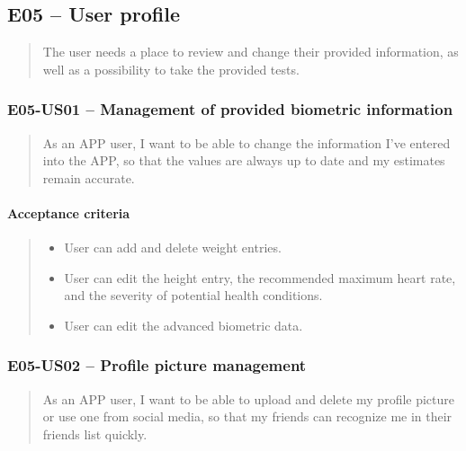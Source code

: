 
\subsection*{E05 -- User profile}
\begin{quote}
The user needs a place to review and change their provided information, as well as a possibility to take the provided tests.
\end{quote}

\subsubsection*{E05-US01 -- Management of provided biometric information}
\begin{quote}
As an APP user, I want to be able to change the information I've entered into the APP, so that the values are always up to date and my estimates remain accurate.
\end{quote}

\paragraph*{Acceptance criteria}
\begin{quote}
\begin{itemize}
    \item User can add and delete weight entries.
    \item User can edit the height entry, the recommended maximum heart rate, and the severity of potential health conditions.
    \item User can edit the advanced biometric data.
\end{itemize}
\end{quote}

\subsubsection*{E05-US02 -- Profile picture management}
\begin{quote}
As an APP user, I want to be able to upload and delete my profile picture or use one from social media, so that my friends can recognize me in their friends list quickly.
\end{quote}

